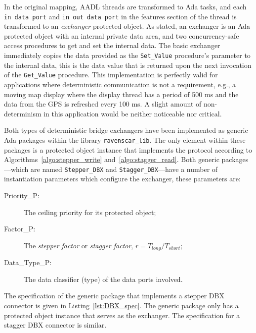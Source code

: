 In the original mapping, AADL threads are transformed to Ada tasks,
and each \texttt{in data port} and \texttt{in out data port} in the
features section of the thread is transformed to an \emph{exchanger}
protected object. As stated, an exchanger is an Ada protected object
with an internal private data area, and two concurrency-safe access
procedures to get and set the internal data. The basic exchanger
immediately copies the data provided as the \texttt{Set\_Value}
procedure's parameter to the internal data, this is the data value
that is returned upon the next invocation of the \texttt{Get\_Value}
procedure. This implementation is perfectly valid for applications
where deterministic communication is not a requirement, e.g., a moving
map display where the display thread has a period of 500 ms and the
data from the GPS is refreshed every 100 ms. A slight amount of
non-determinism in this application would be neither noticeable nor
critical.

Both types of deterministic bridge exchangers have been implemented as
generic Ada packages within the library \texttt{ravenscar\_lib}. The
only element within these packages is a protected object instance that
implements the protocol according to
Algorithms~\ref{algo:stepper_write} and~\ref{algo:stagger_read}. Both
generic packages---which are named \texttt{Stepper\_DBX} and
\texttt{Stagger\_DBX}---have a number of instantiation parameters
which configure the exchanger, these parameters are:

\begin{description}
\item[Priority\_P:]{The ceiling priority for its protected object;}
\item[Factor\_P:]{The \emph{stepper factor} or \emph{stagger factor},
  $r=T_{long}/T_{short}$;}
\item[Data\_Type\_P:]{The data classifier (type) of the data ports
  involved.} 
\end{description}

The specification of the generic package that implements a stepper DBX
connector is given in Listing~\ref{lst:DBX_spec}. The generic package
only has a protected object instance that serves as the exchanger. The
specification for a stagger DBX connector is similar.

